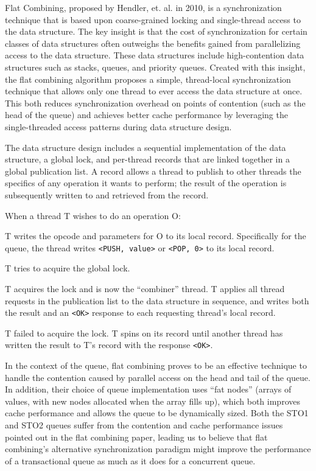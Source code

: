 Flat Combining, proposed by Hendler, et. al. in 2010\cite{Hendler:2010:FCS:1810479.1810540}, is a synchronization technique that is based upon coarse-grained locking and single-thread access to the data structure. The key insight is that the cost of synchronization for certain classes of data structures often outweighs the benefits gained from parallelizing access to the data structure. These data structures include high-contention data structures such as stacks, queues, and priority queues. Created with this insight, the flat combining algorithm proposes a simple, thread-local synchronization technique that allows only one thread to ever access the data structure at once. This both reduces synchronization overhead on points of contention (such as the head of the queue) and achieves better cache performance by leveraging the single-threaded access patterns during data structure design.

The data structure design includes a sequential implementation of the data structure, a global lock, and per-thread records that are linked together in a global publication list. A record allows a thread to publish to other threads the specifics of any operation it wants to perform; the result of the operation is subsequently written to and retrieved from the record.

When a thread T wishes to do an operation O:
\begin{ordlist}
    \item T writes the opcode and parameters for O to its local record. Specifically for the queue, the thread writes \texttt{<PUSH, value>} or \texttt{<POP, 0>} to its local record.
   \item T tries to acquire the global lock.
   \begin{ordlist}
        \item T acquires the lock and is now the “combiner” thread. T applies all thread requests in the publication list to the data structure in sequence, and writes both the result and an \texttt{<OK>} response to each requesting thread’s local record.
        \item T failed to acquire the lock. T spins on its record until another thread has written the result to T’s record with the response \texttt{<OK>}.
    \end{ordlist}
\end{ordlist}

In the context of the queue, flat combining proves to be an effective technique to handle the contention caused by parallel access on the head and tail of the queue. In addition, their choice of queue implementation uses “fat nodes” (arrays of values, with new nodes allocated when the array fills up), which both improves cache performance and allows the queue to be dynamically sized. Both the STO1 and STO2 queues suffer from the contention and cache performance issues pointed out in the flat combining paper, leading us to believe that flat combining’s alternative synchronization paradigm might improve the performance of a transactional queue as much as it does for a concurrent queue.

